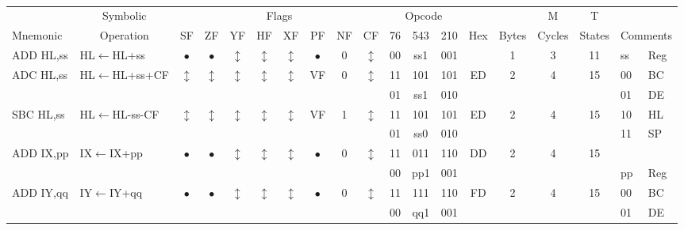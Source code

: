 \documentclass[oneside,a4paper]{book}
\begin{document}
{\tt \scriptsize \setlength{\fboxsep}{0.25mm}
\setlength{\tabcolsep}{1mm}
\begin{tabular}{llc@{ }c@{ }c@{ }c@{ }c@{ }c@{ }c@{ }cc@{ }c@{ }cccccll}\hline
 & \multicolumn{1}{c}{Symbolic} & \multicolumn{8}{c}{Flags} & \multicolumn{3}{c}{Opcode} & & & M & T & \\
Mnemonic & \multicolumn{1}{c}{Operation} & SF & ZF & YF & HF & XF & PF & NF & CF & 76 & 543 & 210 
	& Hex & Bytes & Cycles & States & \multicolumn{2}{l}{Comments} \\ \hline

ADD HL,ss & HL$\leftarrow$HL+ss &
	$\bullet$ & $\bullet$ & $\updownarrow$\footnotemark[2] & $\updownarrow$\footnotemark[2] & $\updownarrow$\footnotemark[2] & 
	$\bullet$ & 0 & $\updownarrow$\footnotemark[1] & 00 & ss1 & 001
	&  & 1 & 3 & 11 & ss & Reg \\ \cline{18-19}

ADC HL,ss & HL$\leftarrow$HL+ss+CF &
	$\updownarrow$\footnotemark[1] & $\updownarrow$\footnotemark[1] & $\updownarrow$\footnotemark[2] & $\updownarrow$\footnotemark[2] & 
	$\updownarrow$\footnotemark[2] & VF\footnotemark[1] & 0 & $\updownarrow$\footnotemark[1] & 11 & 101 & 101
	&  ED & 2 & 4 & 15 & 00 & BC \\
\multicolumn{10}{c}{} & 01 & ss1 & 010 & & \multicolumn{3}{c}{} & 01 & DE \\ 

SBC HL,ss & HL$\leftarrow$HL-ss-CF &
	$\updownarrow$\footnotemark[1] & $\updownarrow$\footnotemark[1] & $\updownarrow$\footnotemark[2] & $\updownarrow$\footnotemark[2] & 
	$\updownarrow$\footnotemark[2] & VF\footnotemark[1] & 1 & $\updownarrow$\footnotemark[1] & 11 & 101 & 101
	&  ED & 2 & 4 & 15 & 10 & HL \\
\multicolumn{10}{c}{} & 01 & ss0 & 010 & & \multicolumn{3}{c}{} & 11 & SP \\ 

ADD IX,pp & IX$\leftarrow$IX+pp &
	$\bullet$ & $\bullet$ & $\updownarrow$\footnotemark[2] & $\updownarrow$\footnotemark[2] & $\updownarrow$\footnotemark[2] & 
	$\bullet$ & 0 & $\updownarrow$\footnotemark[1] & 11 & 011 & 110
	& DD & 2 & 4 & 15 & & \\
\multicolumn{10}{c}{} & 00 & pp1 & 001 & & \multicolumn{3}{c}{} & pp & Reg \\ \cline{18-19}

ADD IY,qq & IY$\leftarrow$IY+qq &
	$\bullet$ & $\bullet$ & $\updownarrow$\footnotemark[2] & $\updownarrow$\footnotemark[2] & $\updownarrow$\footnotemark[2] & 
	$\bullet$ & 0 & $\updownarrow$\footnotemark[1] & 11 & 111 & 110
	& FD & 2 & 4 & 15 & 00 & BC \\
\multicolumn{10}{c}{} & 00 & qq1 & 001 & & \multicolumn{3}{c}{} & 01 & DE \\


\end{tabular}}
\end{document}
